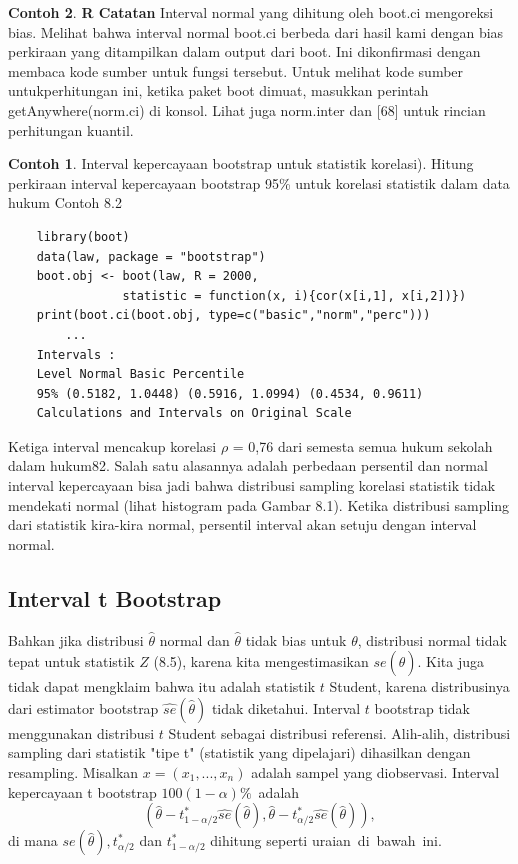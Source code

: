 \documentclass[a4paper,12pt]{article}
\theoremstyle{definition}
\newtheorem{example}{Contoh}[section]
\begin{document}
\begin{example}
\textbf{R Catatan}
Interval normal yang dihitung oleh boot.ci mengoreksi bias. Melihat bahwa interval normal boot.ci berbeda dari hasil kami dengan bias perkiraan yang ditampilkan dalam output dari boot. Ini dikonfirmasi dengan membaca kode sumber untuk fungsi tersebut. Untuk melihat kode sumber untukperhitungan ini, ketika paket boot dimuat, masukkan perintah getAnywhere(norm.ci) di konsol. Lihat juga norm.inter dan [68] untuk rincian perhitungan kuantil.
\begin{example}
    Interval kepercayaan bootstrap untuk statistik korelasi). Hitung perkiraan interval kepercayaan bootstrap 95\% untuk korelasi statistik dalam data hukum Contoh 8.2
\begin{lstlisting}
    library(boot)
    data(law, package = "bootstrap")
    boot.obj <- boot(law, R = 2000,
                statistic = function(x, i){cor(x[i,1], x[i,2])})
    print(boot.ci(boot.obj, type=c("basic","norm","perc")))
        ...
    Intervals :
    Level Normal Basic Percentile
    95% (0.5182, 1.0448) (0.5916, 1.0994) (0.4534, 0.9611)
    Calculations and Intervals on Original Scale
\end{lstlisting}
Ketiga interval mencakup korelasi $\rho $ = 0,76 dari semesta semua hukum sekolah dalam hukum82. Salah satu alasannya adalah perbedaan persentil dan normal interval kepercayaan bisa jadi bahwa distribusi sampling korelasi statistik tidak mendekati normal (lihat histogram pada Gambar 8.1). Ketika
distribusi sampling dari statistik kira-kira normal, persentil interval akan setuju dengan interval normal.
\end{example}
\end{example}

\subsection{Interval t Bootstrap}
Bahkan jika distribusi $\hat{\theta}$ normal dan $\hat{\theta}$ tidak bias untuk $\theta$, distribusi normal tidak tepat untuk statistik $Z$ (8.5), karena kita mengestimasikan $se(\hat{\theta})$.  Kita juga tidak dapat mengklaim bahwa itu adalah statistik $t$ Student, karena distribusinya dari estimator bootstrap $\widehat{se}(\hat{\theta})$ tidak diketahui.  Interval $t$ bootstrap tidak menggunakan distribusi $t$ Student sebagai distribusi referensi. Alih-alih, distribusi sampling dari statistik "tipe t" (statistik yang dipelajari) dihasilkan dengan resampling. Misalkan $x = (x_{1}, ..., x_{n})$ adalah sampel yang diobservasi.  Interval kepercayaan t bootstrap $100(1-\alpha)\%$ adalah
\begin{equation*}
(\hat{\theta}-t_{1-\alpha/2}^{*}\widehat{se}(\hat{\theta}),     \hat{\theta}-t_{\alpha/2}^{*}\widehat{se}(\hat{\theta})),
\end{equation*}
di mana $\widehat{se}(\hat{\theta}), t_{\alpha/2}^{*}$ dan $t_{1-\alpha/2}^{*}$ dihitung seperti uraian di bawah ini.
\end{document}

